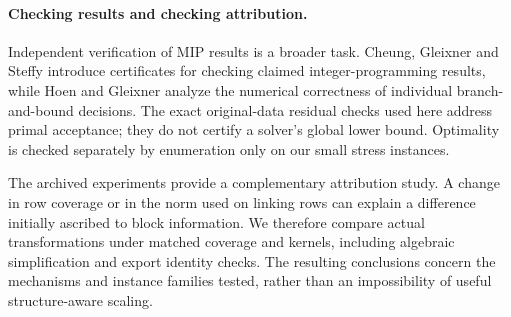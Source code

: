 \paragraph{Checking results and checking attribution.}
Independent verification of MIP results is a broader task. Cheung, Gleixner and
Steffy \cite{cheung2017certificates} introduce certificates for checking claimed
integer-programming results, while Hoen and Gleixner \cite{hoen2024correctness}
analyze the numerical correctness of individual branch-and-bound decisions.
The exact original-data residual checks used here address primal acceptance;
they do not certify a solver's global lower bound. Optimality is checked separately
by enumeration only on our small stress instances.

The archived experiments provide a complementary attribution study. A change in
row coverage or in the norm used on linking rows can explain a difference initially
ascribed to block information. We therefore compare actual transformations under
matched coverage and kernels, including algebraic simplification and export
identity checks. The resulting conclusions concern the mechanisms and instance
families tested, rather than an impossibility of useful structure-aware scaling.
